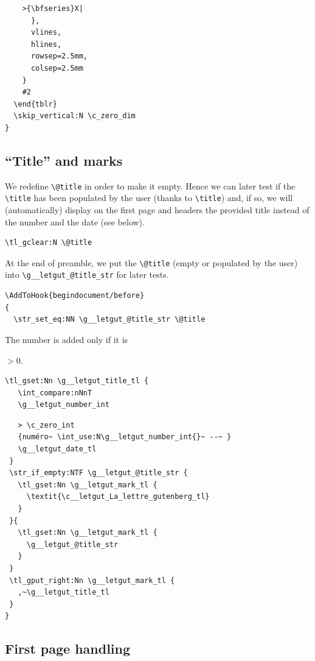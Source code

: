\documentclass{letgut}
\begin{document}
\begin{lstlisting}
	>{\bfseries}X|
      },
      vlines,
      hlines,
      rowsep=2.5mm,
      colsep=2.5mm
    }
    #2
  \end{tblr}
  \skip_vertical:N \c_zero_dim
}
\end{lstlisting}

\subsection{“Title” and marks}
\label{sec:org7f25fee}

We redefine \lstinline+\@title+ in order to make it empty. Hence we can later test if
the \lstinline+\title+ has been populated by the user (thanks to \lstinline+\title+) and, if so,
we will (automatically) display on the first page and headers the provided
title instead of the number and the date (see below).
\begin{lstlisting}
\tl_gclear:N \@title
\end{lstlisting}

At the end of preamble, we put the \lstinline+\@title+ (empty or populated by the
user) into \lstinline+\g__letgut_@title_str+ for later tests.
\begin{lstlisting}
\AddToHook{begindocument/before}
{
  \str_set_eq:NN \g__letgut_@title_str \@title
\end{lstlisting}

The number is added only if it is

\(>0\).

\begin{lstlisting}
\tl_gset:Nn \g__letgut_title_tl {
   \int_compare:nNnT
   \g__letgut_number_int
\end{lstlisting}

\begin{lstlisting}
   > \c_zero_int
   {numéro~ \int_use:N\g__letgut_number_int{}~ --~ }
   \g__letgut_date_tl
 }
 \str_if_empty:NTF \g__letgut_@title_str {
   \tl_gset:Nn \g__letgut_mark_tl {
     \textit{\c__letgut_La_lettre_gutenberg_tl}
   }
 }{
   \tl_gset:Nn \g__letgut_mark_tl {
     \g__letgut_@title_str
   }
 }
 \tl_gput_right:Nn \g__letgut_mark_tl {
   ,~\g__letgut_title_tl
 }
}
\end{lstlisting}

\subsection{First page handling}
\label{sec:org30496fe}
\end{document}
